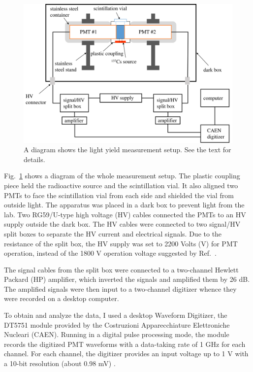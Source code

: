 \begin{figure}[htbp]
	\centering	
	\includegraphics[width=12cm]{teLSsetup.png}
	\caption[A diagram shows the light yield measurement setup.]{A diagram shows the light yield measurement setup. See the text for details.}
	\label{teLSsetup}
\end{figure}

Fig.~\ref{teLSsetup} shows a diagram of the whole measurement setup. The plastic coupling piece held the radioactive source and the scintillation vial. It also aligned two PMTs to face the scintillation vial from each side and shielded the vial from outside light. The apparatus was placed in a dark box to prevent light from the lab. Two RG59/U-type high voltage (HV) cables connected the PMTs to an HV supply outside the dark box. The HV cables were connected to two signal/HV split boxes to separate the HV current and electrical signals. Due to the resistance of the split box, the HV supply was set to 2200 Volts (V) for PMT operation, instead of the 1800 V operation voltage suggested by Ref.~\cite{pmtR580}. 

The signal cables from the split box were connected to a two-channel Hewlett Packard (HP) amplifier, which inverted the signals and amplified them by 26 dB. The amplified signals were then input to a two-channel digitizer whence they were recorded on a desktop computer.

To obtain and analyze the data, I used a desktop Waveform Digitizer, the DT5751 module provided by the Costruzioni Apparecchiature Elettroniche Nucleari (CAEN). Running in a digital pulse processing mode, the module records the digitized PMT waveforms with a data-taking rate of 1 GHz for each channel. For each channel, the digitizer provides an input voltage up to 1 V with a 10-bit resolution (about 0.98 mV) \cite{caen}.

